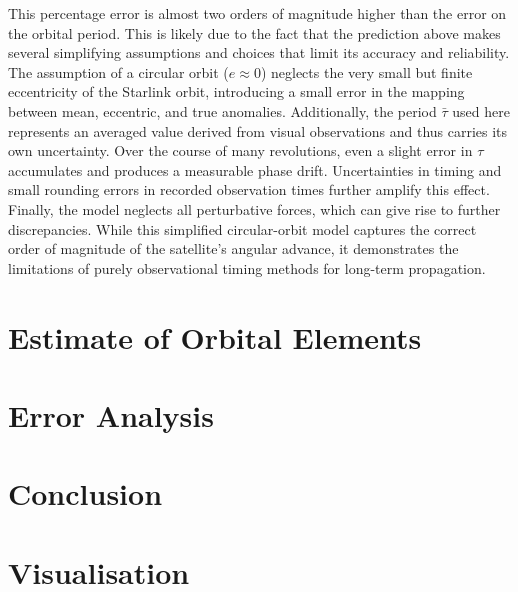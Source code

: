 \documentclass{article}
\begin{document}
This percentage error is almost two orders of magnitude higher than the error on the orbital period. This is likely due to the fact that the prediction above makes several simplifying assumptions and choices that limit its accuracy and reliability. The assumption of a circular orbit ($e \approx 0$) neglects the very small but finite eccentricity of the Starlink orbit, introducing a small error in the mapping between mean, eccentric, and true anomalies. Additionally, the period $\bar{\tau}$ used here represents an averaged value derived from visual observations and thus carries its own uncertainty. Over the course of many revolutions, even a slight error in $\tau$ accumulates and produces a measurable phase drift. Uncertainties in timing and small rounding errors in recorded observation times further amplify this effect. Finally, the model neglects all perturbative forces, which can give rise to further discrepancies. While this simplified circular-orbit model captures the correct order of magnitude of the satellite’s angular advance, it demonstrates the limitations of purely observational timing methods for long-term propagation.

\section{Estimate of Orbital Elements} \label{sec:orbital_elements}



\section{Error Analysis}

\section{Conclusion}

\section{Visualisation}
\end{document}
